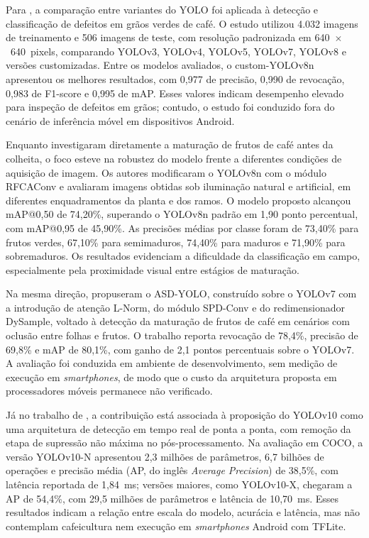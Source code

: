 \documentclass[artigo,times,capa]{iftex2024}
\begin{document}
Para \textcite{Gope2024Comparative}, a comparação entre variantes do \ac{YOLO} foi
aplicada à detecção e classificação de defeitos em grãos verdes de café. O
estudo utilizou 4.032 imagens de treinamento e 506 imagens de teste, com
resolução padronizada em 640~$\times$~640~pixels, comparando YOLOv3, YOLOv4,
YOLOv5, YOLOv7, YOLOv8 e versões customizadas. Entre os modelos avaliados, o
custom-YOLOv8n apresentou os melhores resultados, com 0,977 de precisão, 0,990
de revocação, 0,983 de F1-score e 0,995 de mAP. Esses valores indicam desempenho elevado para inspeção de defeitos em grãos; contudo, o estudo foi conduzido fora
do cenário de inferência móvel em dispositivos Android.

Enquanto \textcite{Kazama2024Monitoring} investigaram diretamente a maturação de
frutos de café antes da colheita, o foco esteve na robustez do modelo frente a
diferentes condições de aquisição de imagem. Os autores modificaram o YOLOv8n
com o módulo RFCAConv e avaliaram imagens obtidas sob iluminação natural e
artificial, em diferentes enquadramentos da planta e dos ramos. O modelo
proposto alcançou mAP@0,50 de 74,20\%, superando o YOLOv8n padrão em 1,90 ponto
percentual, com mAP@0,95 de 45,90\%. As precisões médias por classe foram de
73,40\% para frutos verdes, 67,10\% para semimaduros, 74,40\% para maduros e
71,90\% para sobremaduros. Os resultados evidenciam a dificuldade da classificação em
campo, especialmente pela proximidade visual entre estágios de maturação.

Na mesma direção, \textcite{Ye2025ASD} propuseram o ASD-YOLO, construído
sobre o YOLOv7 com a introdução de atenção L-Norm, do módulo SPD-Conv e do
redimensionador DySample, voltado à detecção da maturação de frutos de café
em cenários com oclusão entre folhas e frutos. O trabalho reporta revocação
de 78,4\%, precisão de 69,8\% e \ac{mAP} de 80,1\%, com ganho de 2,1
pontos percentuais sobre o YOLOv7. A avaliação foi conduzida em ambiente de
desenvolvimento, sem medição de execução em \textit{smartphones}, de modo
que o custo da arquitetura proposta em processadores móveis permanece não
verificado.

Já no trabalho de \textcite{Wang2024YOLOv10}, a contribuição está associada à proposição
do YOLOv10 como uma arquitetura de detecção em tempo real de ponta a ponta, com
remoção da etapa de supressão não máxima no pós-processamento. Na avaliação em
COCO, a versão YOLOv10-N apresentou 2,3 milhões de parâmetros, 6,7 bilhões de
operações e precisão média (AP, do inglês \textit{Average Precision}) de 38,5\%, com latência reportada de 1,84~ms; versões maiores,
como YOLOv10-X, chegaram a AP de 54,4\%, com 29,5 milhões de parâmetros e
latência de 10,70~ms. Esses resultados indicam a relação entre escala do modelo,
acurácia e latência, mas não contemplam cafeicultura nem execução em
\textit{smartphones} Android com \ac{TFLite}.
\end{document}
